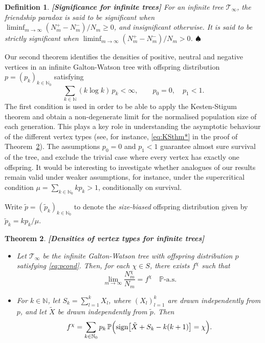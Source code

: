 \documentclass[11pt]{article}
\numberwithin{equation}{section}
\theoremstyle{plain}
\newtheorem{theorem}{Theorem}[section]
\newtheorem{definition}[theorem]{Definition}
\newcommand{\N}{\mathbb N}
\newcommand{\PP}{\mathbb{P}}
\newcommand{\tX}{\tilde{X}}
\begin{document}
\begin{definition}{\bf [Significance for infinite trees]}
\label{def:infinite-significance}
{\rm  For an infinite tree $\mathcal{T}_\infty$, the friendship paradox is said to be \textit{significant} when $\liminf_{m\to\infty} (N_m^+ - N_m^-)/N_m \geq 0$, and \textit{insignificant} otherwise. It is said to be \textit{strictly significant} when $\liminf_{m\to\infty} (N_m^+ - N_m^-)/N_m > 0$.} \hfill$\spadesuit$
\end{definition}

Our second theorem identifies the densities of positive, neutral and negative vertices in an infinite Galton-Watson tree with offspring distribution $p=(p_k)_{k\in\N_0}$ satisfying 
\begin{equation}
\label{eq:pcond}
 \sum_{k\in\N} (k \log k)\, p_k <\infty, \qquad p_0=0, \quad p_1<1.
\end{equation}
The first condition is used in order to be able to apply the Kesten-Stigum theorem \cite{KS} and obtain a non-degenerate limit for the normalised population size of each generation. This plays a key role in understanding the asymptotic behaviour of the different vertex types (see, for instance, \eqref{eq:KSthm*} in the proof of Theorem~\ref{thm:densities-on-infinite-trees}). The assumptions $p_0=0$ and $p_1<1$ guarantee almost sure survival of the tree, and exclude the trivial case where every vertex has exactly one offspring. It would be interesting to investigate whether analogues of our results remain valid under weaker assumptions, for instance, under the supercritical condition $\mu = \sum_{k\in\N_0} k p_k >1$, conditionally on survival.

Write $\tilde{p} = (\tilde{p}_k)_{k\in\N_0}$ to denote the \emph{size-biased} offspring distribution given by $\tilde{p}_k = kp_k/\mu$.

\begin{theorem}{\bf [Densities of vertex types for infinite trees]}
\label{thm:densities-on-infinite-trees}
\begin{itemize}
\item[(a)] 
Let $\mathcal{T}_\infty$ be the infinite Galton-Watson tree with offspring distribution $p$ satisfying \eqref{eq:pcond}. Then, for each $\chi \in S$, there exists $f^\chi$  such that 
\[
\lim_{m\to\infty} \frac{N_m^\chi}{N_m} = f^\chi \quad \PP\text{-}\mathrm{a.s.}
\] 
\item[(b)] 
For $k \in \N$, let $S_k= \sum_{l=1}^k X_l$, where $(X_l)_{l=1}^k$ are drawn independently from $p$, and let $\tilde{X}$ be drawn independently from $\tilde{p}$. Then
\[
f^\chi = \sum_{k \in \N_0} p_k\,\PP\Big({\rm sign}\big[\tX+S_k-k(k+1)\big] = \chi\Big).
\]
\end{itemize}
\end{theorem}
\end{document}
